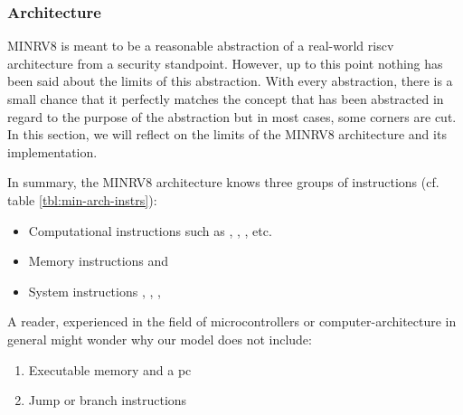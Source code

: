 \subsubsection{Architecture}

MINRV8 is meant to be a reasonable abstraction of a real-world \gls{riscv} architecture from a security standpoint.
However, up to this point nothing has been said about the limits of this abstraction.
With every abstraction, there is a small chance that it perfectly matches the concept that has been abstracted in regard to the purpose of the abstraction but in most cases, some corners are cut.
In this section, we will reflect on the limits of the MINRV8 architecture and its implementation.


In summary, the MINRV8 architecture knows three groups of instructions (cf. table \ref{tbl:min-arch-instrs}):
\begin{itemize}
    \item Computational instructions such as , , , etc.
    \item Memory instructions  and 
    \item System instructions , , , 
\end{itemize}

A reader, experienced in the field of microcontrollers or computer-architecture in general might wonder why our model does not include:
\begin{enumerate}
    \item Executable memory and a \gls{pc}
    \item Jump or branch instructions
\end{enumerate}

